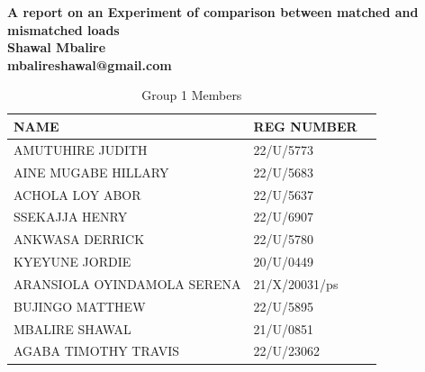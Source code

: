 \documentclass{report}
\begin{document}
    \begin{titlepage}
        \begin{center}
        {\huge\bfseries A report on an Experiment of comparison between matched and mismatched loads\\}
        \vspace{1.5cm}
        {\Large\bfseries Shawal Mbalire}\\[5pt]
        \bfseries mbalireshawal@gmail.com\\[14pt]
        \vspace{1cm}
        
        \begin{table}[ht]
            \centering
            \begin{tabular}{lll}
            \toprule
            NAME & REG NUMBER \\
            \midrule
            AMUTUHIRE JUDITH & 22/U/5773 \\
            AINE MUGABE HILLARY & 22/U/5683 \\
            ACHOLA LOY ABOR & 22/U/5637 \\
            SSEKAJJA HENRY & 22/U/6907 \\
            ANKWASA DERRICK & 22/U/5780 \\
            KYEYUNE JORDIE & 20/U/0449 \\
            ARANSIOLA OYINDAMOLA SERENA & 21/X/20031/ps \\
            BUJINGO MATTHEW & 22/U/5895 \\
            MBALIRE SHAWAL & 21/U/0851 \\
            AGABA TIMOTHY TRAVIS & 22/U/23062 \\
            \bottomrule
            \end{tabular}
            \caption{Group 1 Members}
            \label{tab:student_info}
        \end{table}


\end{center}
\end{titlepage}
\end{document}
